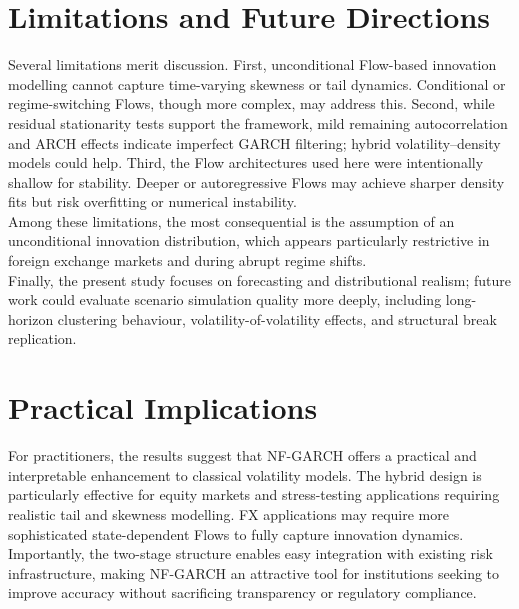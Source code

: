 \documentclass[oneside,12pt]{CUEDthesisPSnPDF}
\begin{document}
\section{Limitations and Future Directions}

\noindent
Several limitations merit discussion. First, unconditional Flow-based innovation modelling cannot capture time-varying skewness or tail dynamics. Conditional or regime-switching Flows, though more complex, may address this. Second, while residual stationarity tests support the framework, mild remaining autocorrelation and ARCH effects indicate imperfect GARCH filtering; hybrid volatility–density models could help. Third, the Flow architectures used here were intentionally shallow for stability. Deeper or autoregressive Flows may achieve sharper density fits but risk overfitting or numerical instability.\\

Among these limitations, the most consequential is the assumption of an unconditional innovation distribution, which appears particularly restrictive in foreign exchange markets and during abrupt regime shifts.\\

Finally, the present study focuses on forecasting and distributional realism; future work could evaluate scenario simulation quality more deeply, including long-horizon clustering behaviour, volatility-of-volatility effects, and structural break replication.\\

\section{Practical Implications}

\noindent
For practitioners, the results suggest that NF-GARCH offers a practical and interpretable enhancement to classical volatility models. The hybrid design is particularly effective for equity markets and stress-testing applications requiring realistic tail and skewness modelling. FX applications may require more sophisticated state-dependent Flows to fully capture innovation dynamics. Importantly, the two-stage structure enables easy integration with existing risk infrastructure, making NF-GARCH an attractive tool for institutions seeking to improve accuracy without sacrificing transparency or regulatory compliance.\\
\end{document}
